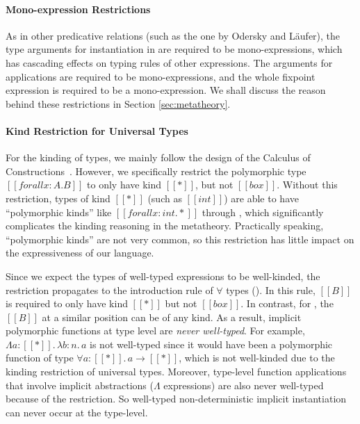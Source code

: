 \paragraph{Mono-expression Restrictions}
As in other predicative relations (such as the one by Odersky and L\"aufer),
the type arguments for instantiation in  are
required to be mono-expressions, which has cascading effects on typing rules of
other expressions. The arguments for applications are required to be
mono-expressions, and the whole fixpoint expression is required to be a
mono-expression. We shall
discuss the reason behind these restrictions in Section \ref{sec:metatheory}.

\paragraph{Kind Restriction for Universal Types}
\label{sec:kind-restriction}

For the kinding of types, we mainly follow the design of the Calculus of
Constructions~\citep{coc}. However, we specifically restrict
the polymorphic type $[[forall x : A. B]]$ to only have kind $[[*]]$, but not $[[box]]$.
Without this restriction, types of kind $[[*]]$ (such as $[[int]]$) are able to
have ``polymorphic kinds'' like $[[forall x : int. *]]$ through ,
which significantly complicates the kinding reasoning in the metatheory.
Practically speaking, ``polymorphic kinds'' are not very common, so this
restriction has little impact on the expressiveness of our language.

Since we expect the types of well-typed expressions to be well-kinded,
the restriction propagates to the introduction rule of $\forall$ types ().
In this rule, $[[B]]$ is required to only have kind $[[*]]$ but not $[[box]]$.
In contrast, for , the $[[B]]$ at a similar position can be of any kind.
As a result, implicit polymorphic functions at type level are \emph{never well-typed}.
For example, $\Lambda a : [[*]].\, \lambda b : n.\, a$ is not
well-typed since it would have been a polymorphic function of type
$\forall a : [[*]].\, a \rightarrow [[*]]$, which is not well-kinded due to the
kinding restriction of universal types.
Moreover, type-level function applications that involve implicit
abstractions ($\Lambda$ expressions) are also never well-typed
because of the restriction. So well-typed non-deterministic implicit instantiation can never occur
at the type-level.

